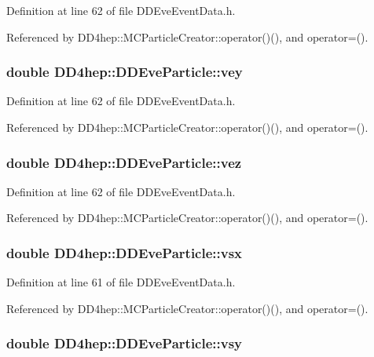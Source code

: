 Definition at line 62 of file DDEveEventData.h.

Referenced by DD4hep::MCParticleCreator::operator()(), and operator=().\hypertarget{class_d_d4hep_1_1_d_d_eve_particle_a3e6f78f4ccc5d78ae52a28c33fcf0b44}{
\subsubsection[{vey}]{\setlength{\rightskip}{0pt plus 5cm}double {\bf DD4hep::DDEveParticle::vey}}}
\label{class_d_d4hep_1_1_d_d_eve_particle_a3e6f78f4ccc5d78ae52a28c33fcf0b44}


Definition at line 62 of file DDEveEventData.h.

Referenced by DD4hep::MCParticleCreator::operator()(), and operator=().\hypertarget{class_d_d4hep_1_1_d_d_eve_particle_ad573d5c2205c4d4c6908637c34f9233a}{
\subsubsection[{vez}]{\setlength{\rightskip}{0pt plus 5cm}double {\bf DD4hep::DDEveParticle::vez}}}
\label{class_d_d4hep_1_1_d_d_eve_particle_ad573d5c2205c4d4c6908637c34f9233a}


Definition at line 62 of file DDEveEventData.h.

Referenced by DD4hep::MCParticleCreator::operator()(), and operator=().\hypertarget{class_d_d4hep_1_1_d_d_eve_particle_a28dbdeb3997f9b8342ccd4c9e6991a92}{
\subsubsection[{vsx}]{\setlength{\rightskip}{0pt plus 5cm}double {\bf DD4hep::DDEveParticle::vsx}}}
\label{class_d_d4hep_1_1_d_d_eve_particle_a28dbdeb3997f9b8342ccd4c9e6991a92}


Definition at line 61 of file DDEveEventData.h.

Referenced by DD4hep::MCParticleCreator::operator()(), and operator=().\hypertarget{class_d_d4hep_1_1_d_d_eve_particle_a44cd9286a2e84819c40fc89f426fe322}{
\subsubsection[{vsy}]{\setlength{\rightskip}{0pt plus 5cm}double {\bf DD4hep::DDEveParticle::vsy}}}
\label{class_d_d4hep_1_1_d_d_eve_particle_a44cd9286a2e84819c40fc89f426fe322}


